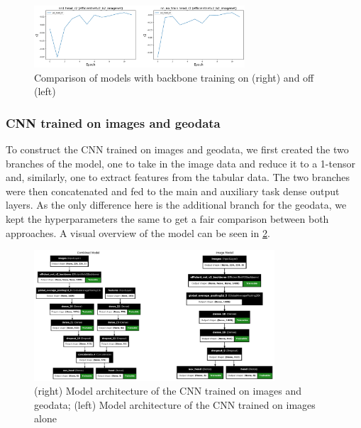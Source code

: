 \documentclass[12pt,a4paper,oneside]{article}
\begin{document}

\begin{figure}[!h]
    \centering
    \includegraphics[width=0.7\textwidth]{assets/train_vs_notrain.png}
    \caption{Comparison of models with backbone training on (right) and off (left)}
    \label{fig:backbone_training}
\end{figure}

\subsubsection{CNN trained on images and geodata}

To construct the CNN trained on images and geodata, we first created the two branches of the model, one to take in the image data and reduce it to a 1-tensor and, similarly, one to extract features from the tabular data. The two branches were then concatenated and fed to the main and auxiliary task dense output layers. As the only difference here is the additional branch for the geodata, we kept the hyperparameters the same to get a fair comparison between both approaches. A visual overview of the model can be seen in \ref{fig:geodata_model}.

\begin{figure}[!h]
    \centering 
    \includegraphics[width=0.8\textwidth]{assets/img_geo_model.png}
    \caption{(right) Model architecture of the CNN trained on images and geodata; (left) Model architecture of the CNN trained on images alone}
    \label{fig:geodata_model}
\end{figure}
\end{document}
